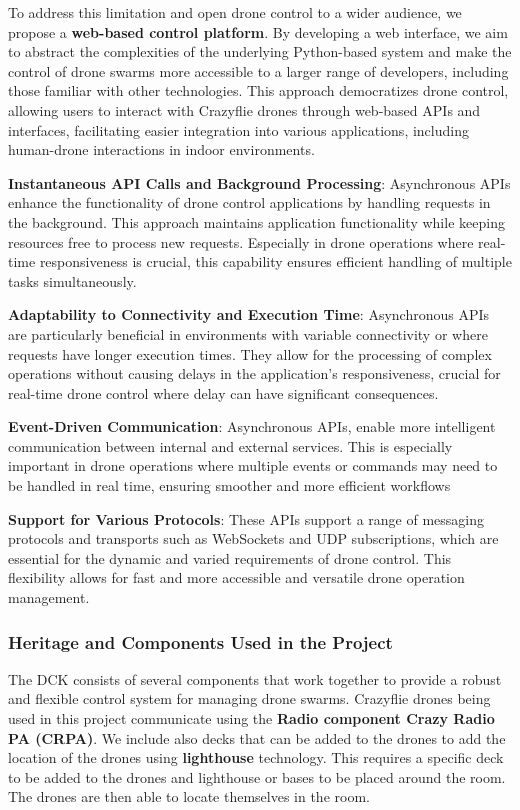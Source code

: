 To address this limitation and open drone control to a wider audience, we propose a \textbf{web-based control platform}. By developing a web interface, we aim to abstract the complexities of the underlying Python-based system and make the control of drone swarms more accessible to a larger range of developers, including those familiar with other technologies. This approach democratizes drone control, allowing users to interact with Crazyflie drones through web-based \gls{API}s and interfaces, facilitating easier integration into various applications, including human-drone interactions in indoor environments.

\textbf{Instantaneous \gls{API} Calls and Background Processing}: Asynchronous \gls{API}s enhance the functionality of drone control applications by handling requests in the background. This approach maintains application functionality while keeping resources free to process new requests. Especially in drone operations where real-time responsiveness is crucial, this capability ensures efficient handling of multiple tasks simultaneously.

\textbf{Adaptability to Connectivity and Execution Time}: Asynchronous \gls{API}s are particularly beneficial in environments with variable connectivity or where requests have longer execution times. They allow for the processing of complex operations without causing delays in the application's responsiveness, crucial for real-time drone control where delay can have significant consequences.

\textbf{Event-Driven Communication}: Asynchronous \gls{API}s, enable more intelligent communication between internal and external services. This is especially important in drone operations where multiple events or commands may need to be handled in real time, ensuring smoother and more efficient workflows

\textbf{Support for Various Protocols}: These \gls{API}s support a range of messaging protocols and transports such as WebSockets and UDP subscriptions, which are essential for the dynamic and varied requirements of drone control. This flexibility allows for fast and more accessible and versatile drone operation management.
\subsubsection{Heritage and Components Used in the Project}
The \gls{DCK} consists of several components that work together to provide a robust and flexible control system for managing drone swarms. Crazyflie drones being used in this project communicate using the \textbf{Radio component Crazy Radio PA (\gls{CRPA})}. We include also decks that can be added to the drones to add the location of the drones using \textbf{\gls{lighthouse}} technology. This requires a specific deck to be added to the drones and \gls{lighthouse} or bases to be placed around the room. The drones are then able to locate themselves in the room.
\cite{carstens_intelligent_nodate}

